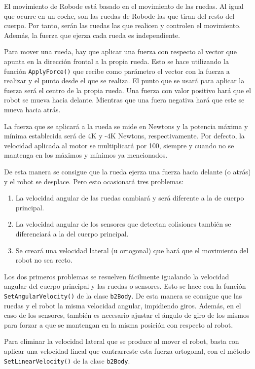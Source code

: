 El movimiento de Robode está basado en el movimiento de las ruedas. Al igual que ocurre en un coche, son las ruedas de Robode las que tiran del resto del cuerpo. Por tanto, serán las ruedas las que realicen y controlen el movimiento. Además, la fuerza que ejerza cada rueda es independiente. 

Para mover una rueda, hay que aplicar una fuerza con respecto al vector que apunta en la dirección frontal a la propia rueda. Esto se hace utilizando la función \texttt{ApplyForce()} que recibe como parámetro el vector con la fuerza a realizar y el punto desde el que se realiza. El punto que se usará para aplicar la fuerza será el centro de la propia rueda. Una fuerza con valor positivo hará que el robot se mueva hacia delante. Mientras que una fuera negativa hará que este se mueva hacia atrás.

La fuerza que se aplicará a la rueda se mide en Newtons y la potencia máxima y mínima establecida será de 4K y -4K Newtons, respectivamente. Por defecto, la velocidad aplicada al motor se multiplicará por 100, siempre y cuando no se mantenga en los máximos y mínimos ya mencionados.

De esta manera se consigue que la rueda ejerza una fuerza hacia delante (o atrás) y el robot se desplace. Pero esto ocasionará tres problemas: 

\begin{enumerate}
	\item La velocidad angular de las ruedas cambiará y será diferente a la de cuerpo principal.
	\item La velocidad angular de los sensores que detectan colisiones también se diferenciará a la del cuerpo principal.
	\item Se creará una velocidad lateral (u ortogonal) que hará que el movimiento del robot no sea recto.
\end{enumerate} 

Los dos primeros problemas se resuelven fácilmente igualando la velocidad angular del cuerpo principal y las ruedas o sensores. Esto se hace con la función \texttt{SetAngularVelocity()} de la clase \texttt{b2Body}. De esta manera se consigue que las ruedas y el robot la misma velocidad angular, impidiendo giros. Además, en el caso de los sensores, también es necesario ajustar el ángulo de giro de los mismos para forzar a que se mantengan en la misma posición con respecto al robot.

Para eliminar la velocidad lateral que se produce al mover el robot, basta con aplicar una velocidad lineal que contrarreste esta fuerza ortogonal, con el método \texttt{SetLinearVelocity()}  de la clase \texttt{b2Body}. 

